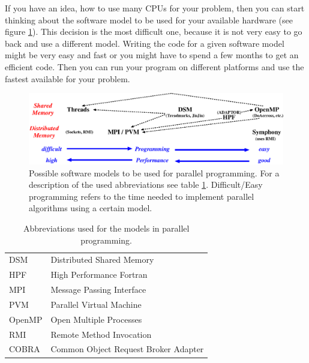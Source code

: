 If you have an idea, how to use many CPUs for your problem, then you can
start thinking about the software model to be used for your available hardware
(see figure \ref{fig:ParallelSoftware}).
This decision is the most difficult one, because it is not very easy
to go back and use a different model. Writing the code 
for a given software model might be very easy and fast or you might have to
spend a few months to get an efficient code. Then you can run your program
on different platforms and use the fastest available for your problem.

\begin{figure}[htbp]
  \begin{center}
    \leavevmode
    \includegraphics[width=\textwidth]{Figures/ParallelSoftware.eps}
    \caption{Possible software models to be used for parallel programming. 
      For a description of the used abbreviations see table \ref{tab:ParallelAbbrev}.
      Difficult/Easy programming refers to the time needed to implement
      parallel algorithms using a certain model.}
    \label{fig:ParallelSoftware}
  \end{center}
\end{figure}
\begin{table}[htbp]
  \begin{center}
    \begin{tabular}{ll}
      DSM & Distributed Shared Memory \\
      HPF & High Performance Fortran \\
      MPI & Message Passing Interface \\
      PVM & Parallel Virtual Machine \\
      OpenMP & Open Multiple Processes \\
      RMI & Remote Method Invocation \\
      COBRA & Common Object Request Broker Adapter \\
    \end{tabular}
    \caption{Abbreviations used for the models in parallel programming.}
    \label{tab:ParallelAbbrev}
  \end{center}
\end{table}

